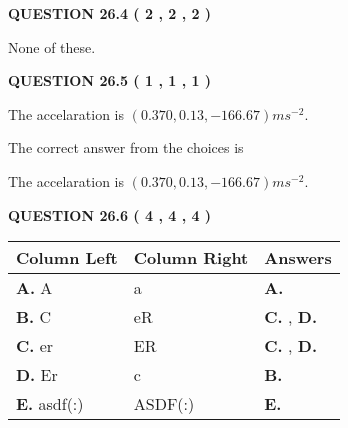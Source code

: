 \documentclass[12pt]{article}
\begin{document}
 
 
 
  
\vspace{0.2in}
  
{\textbf{\Large{QUESTION
26.4 
 (           2 ,           2 ,           2 )
}}}
  
  
 
 
\noindent{}
 
 
 None of these.
 
 
 
 
  
\vspace{0.2in}
  
{\textbf{\Large{QUESTION
26.5 
 (           1 ,           1 ,           1 )
}}}
  
  


 
 
\noindent{}
 
 
The accelaration is $  %
(
0.370,
0.13,
-166.67)
ms^{-2} $.
 
 
 
 
 
 
\noindent{}

The correct answer from the choices is


The accelaration is $  %
(
0.370,
0.13,
-166.67)
ms^{-2} $.
 
 
 
  
\vspace{0.2in}
  
{\textbf{\Large{QUESTION
26.6 
 (           4 ,           4 ,           4 )
}}}
  
  
 
 
\noindent{}
  
  
\begin{tabular}{|l|l|l|}
 \hline
 Column Left & Column Right  & Answers       \\ 
 \hline
{\textbf{\large{
A.}}}
A
  & 
a
 & 
{\textbf{\large{
A.}}}
 \\ 
 \hline
{\textbf{\large{
B.}}}
C
  & 
eR
 & 
{\textbf{\large{
C.}}}
, 
{\textbf{\large{
D.}}}
 \\ 
 \hline
{\textbf{\large{
C.}}}
er
  & 
ER
 & 
{\textbf{\large{
C.}}}
, 
{\textbf{\large{
D.}}}
 \\ 
 \hline
{\textbf{\large{
D.}}}
Er
  & 
c
 & 
{\textbf{\large{
B.}}}
 \\ 
 \hline
{\textbf{\large{
E.}}}
asdf(:)
  & 
ASDF(:)
 & 
{\textbf{\large{
E.}}}
 \\ 
 \hline
 \end{tabular}
  
\end{document}

